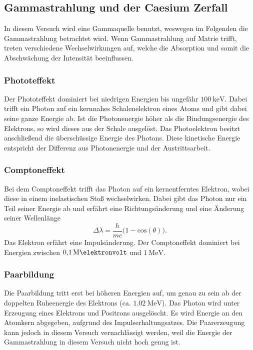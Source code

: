 \subsection{Gammastrahlung und der Caesium Zerfall}
\label{subsec:GammaCaesium}
In diesem Versuch wird eine Gammaquelle benutzt, weswegen im Folgenden die Gammastrahlung betrachtet wird. Wenn Gammastrahlung auf Matrie trifft,
treten verschiedene Wechselwirkungen auf, welche die Absorption und somit die Abschwächung der Intensität beeinflussen. 

\subsubsection{Phototeffekt}
\label{subsubsec:Phototeffekt}
Der Phototeffekt dominiert bei niedrigen Energien bis ungefähr $\qty{100}{\kilo\electronvolt}$.
Dabei trifft ein Photon auf ein kernnahes Schalenelektron eines Atoms und gibt dabei seine ganze Energie ab.
Ist die Photonenergie höher als die Bindungsenergie des Elektrons, so wird dieses aus der Schale ausgelöst.
Das Photoelektron besitzt anschließend die überschüssige Energie des Photons. Diese kinetische Energie entspricht der Differenz aus Photonenergie
und der Austrittsarbeit.

\subsubsection{Comptoneffekt}
\label{subsubsec:Comptoneffekt}
Bei dem Comptoneffekt trifft das Photon auf ein kernentferntes Elektron, wobei diese in einem inelastischen Stoß wechselwirken.
Dabei gibt das Photon nur ein Teil seiner Energie ab und erfährt eine Richtungsänderung und eine Änderung seiner Wellenlänge
\begin{equation}
    \Delta \lambda = \frac{h}{m c} \biggl(1 - \text{cos}(\theta)\biggr).
\end{equation}
Das Elektron erfährt eine Impulsänderung.
Der Comptoneffekt dominiert bei Energien zwischen $\qty{0.1}{\mega\elektronvolt}$ und $\qty{1}{\mega\electronvolt}$.

\subsubsection{Paarbildung}
\label{subsubsec:Paarbildung}
Die Paarbildung tritt erst bei höheren Energien auf, um genau zu sein ab der doppelten Ruheenergie des Elektrons (ca. $\qty{1.02}{\mega\eV}$).
Das Photon wird unter Erzeugung eines Elektrons und Positrons ausgelöscht.
Es wird Energie an den Atomkern abgegeben, aufgrund des Impulserhaltungsatzes.
Die Paarerzeugung kann jedoch in diesem Versuch vernachlässigt werden, weil die Energie der Gammastrahlung in diesem Versuch nicht hoch genug ist.

